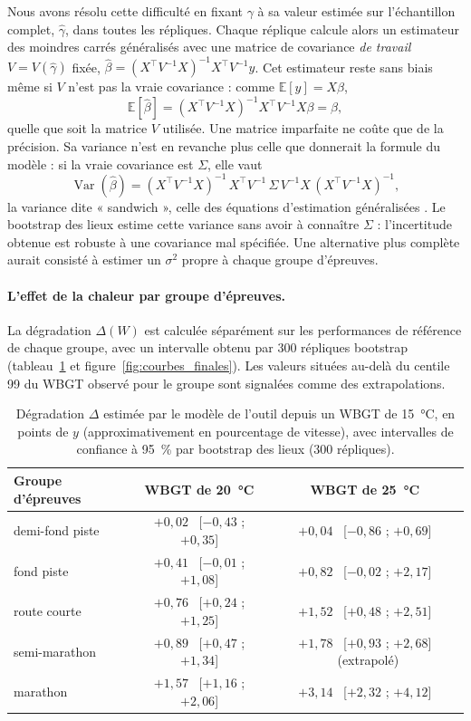 \documentclass[11pt,a4paper]{article}
\newcommand{\E}{\mathbb{E}}
\DeclareMathOperator{\Var}{Var}
\begin{document}
Nous avons résolu cette difficulté en fixant $\gamma$ à sa valeur estimée sur l'échantillon complet, $\hat\gamma$, dans
toutes les répliques. Chaque réplique calcule alors un estimateur des moindres carrés généralisés avec une matrice de
covariance \emph{de travail} $V = V(\hat\gamma)$ fixée, $\hat\beta = (X^\top V^{-1} X)^{-1} X^\top V^{-1} y$. Cet
estimateur reste sans biais même si $V$ n'est pas la vraie covariance : comme $\E[y] = X\beta$,
\[
\E[\hat\beta] = (X^\top V^{-1} X)^{-1} X^\top V^{-1} X\beta = \beta,
\]
quelle que soit la matrice $V$ utilisée. Une matrice imparfaite ne coûte que de la précision. Sa variance n'est en
revanche plus celle que donnerait la formule du modèle : si la vraie covariance est $\Sigma$, elle vaut
\[
\Var(\hat\beta) = (X^\top V^{-1} X)^{-1}\,X^\top V^{-1}\,\Sigma\,V^{-1} X\,(X^\top V^{-1} X)^{-1},
\]
la variance dite « sandwich », celle des équations d'estimation généralisées \citep{liang1986}. Le bootstrap des lieux
estime cette variance sans avoir à connaître $\Sigma$ : l'incertitude obtenue est robuste à une covariance mal
spécifiée. Une alternative plus complète aurait consisté à estimer un $\sigma^2$ propre à chaque groupe d'épreuves.

\paragraph{L'effet de la chaleur par groupe d'épreuves.} La dégradation $\Delta(W)$ est calculée séparément sur les
performances de référence de chaque groupe, avec un intervalle obtenu par 300 répliques bootstrap
(tableau~\ref{tab:effets} et figure~\ref{fig:courbes_finales}). Les valeurs situées au-delà du centile 99 du WBGT
observé pour le groupe sont signalées comme des extrapolations.

\begin{table}[htbp]
\centering
\small
\caption{Dégradation $\Delta$ estimée par le modèle de l'outil depuis un WBGT de 15~°C, en points de $y$
(approximativement en pourcentage de vitesse), avec intervalles de confiance à 95~\% par bootstrap des lieux
(300 répliques).}
\label{tab:effets}
\begin{tabular}{@{}lcc@{}}
\toprule
Groupe d'épreuves & WBGT de 20~°C & WBGT de 25~°C \\
\midrule
demi-fond piste & $+0{,}02$ \ [$-0{,}43$ ; $+0{,}35$] & $+0{,}04$ \ [$-0{,}86$ ; $+0{,}69$] \\
fond piste & $+0{,}41$ \ [$-0{,}01$ ; $+1{,}08$] & $+0{,}82$ \ [$-0{,}02$ ; $+2{,}17$] \\
route courte & $+0{,}76$ \ [$+0{,}24$ ; $+1{,}25$] & $+1{,}52$ \ [$+0{,}48$ ; $+2{,}51$] \\
semi-marathon & $+0{,}89$ \ [$+0{,}47$ ; $+1{,}34$] & $+1{,}78$ \ [$+0{,}93$ ; $+2{,}68$] \ (extrapolé) \\
marathon & $+1{,}57$ \ [$+1{,}16$ ; $+2{,}06$] & $+3{,}14$ \ [$+2{,}32$ ; $+4{,}12$] \\
\bottomrule
\end{tabular}
\end{table}
\end{document}
